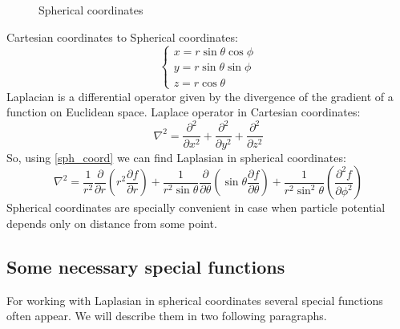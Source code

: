 \documentclass[a4paper, 12pt]{article}
\begin{document}
%
%
\begin{figure}[h!]
\begin{center}
\end{center}
\caption{Spherical coordinates}
\end{figure}
Cartesian coordinates to Spherical coordinates:
\begin{equation} \label{sph_coord}
\begin{cases}
	{x}= {r} \sin{\theta}\cos{\phi} \\
	{y} = {r} \sin{\theta}\sin{\phi} \\
	{z} = {r}\cos{\theta}
\end{cases}
\end{equation}
Laplacian is a differential operator given by the divergence of the gradient of a function on Euclidean space. Laplace operator in Cartesian coordinates:
 	$$\nabla^2= \frac{\partial^2}{\partial x^2}  + \frac{\partial^2}{\partial y^2} + \frac{\partial^2}{\partial z^2}$$
So, using \eqref{sph_coord} we can find Laplasian in spherical coordinates:
\begin{equation}\label{sph_lap}
	\nabla^2 = \frac{1}{r^2} \frac{\partial}{\partial r}({r^2}\frac{\partial f}{\partial r})+\frac{1}{r^2\sin{\theta}}\frac{\partial}{\partial \theta}(\sin{\theta}\frac{\partial f}{\partial \theta})+\frac{1}{r^2\sin^2{\theta}}(\frac{\partial^2 f}{\partial \phi^2})
\end{equation}
Spherical coordinates are specially convenient in case when particle potential depends only on distance from some point.


\subsection{Some  necessary special functions}
For working with Laplasian in spherical coordinates several special functions often appear. We will describe them in two following paragraphs.
\end{document}
